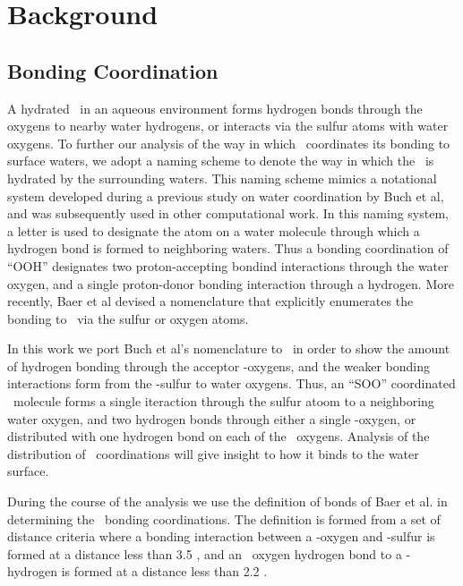 \section {Background}

\subsection {Bonding Coordination}

A hydrated \suldiox~in an aqueous environment forms hydrogen bonds through the oxygens to nearby water hydrogens, or interacts via the sulfur atoms with water oxygens. To further our analysis of the way in which \suldiox~coordinates its bonding to surface waters, we adopt a naming scheme to denote the way in which the \suldiox~is hydrated by the surrounding waters. This naming scheme mimics a notational system developed during a previous study on water coordination by Buch et al,\cite{Buch 2005} and was subsequently used in other computational work.\cite{Walker2006b} In this naming system, a letter is used to designate the atom on a water molecule through which a hydrogen bond is formed to neighboring waters. Thus a bonding coordination of ``OOH'' designates two proton-accepting bondind interactions through the water oxygen, and a single proton-donor bonding interaction through a hydrogen. More recently, Baer et al devised a nomenclature that explicitly enumerates the bonding to \suldiox~via the sulfur or oxygen atoms.\cite{Baer2010} 

In this work we port Buch et al's nomenclature to \suldiox~in order to show the amount of hydrogen bonding through the acceptor \suldiox-oxygens, and the weaker bonding interactions form from the \suldiox-sulfur to water oxygens. Thus, an ``SOO'' coordinated \suldiox~molecule forms a single iteraction through the sulfur atoom to a neighboring water oxygen, and two hydrogen bonds through either a single \suldiox-oxygen, or distributed with one hydrogen bond on each of the \suldiox~oxygens. Analysis of the distribution of \suldiox~coordinations will give insight to how it binds to the water surface.

During the course of the analysis we use the definition of bonds of Baer et al. in determining the \suldiox~bonding coordinations.\cite{Baer2010} The definition is formed from a set of distance criteria where a bonding interaction between a \wat-oxygen and \suldiox-sulfur is formed at a distance less than 3.5 \angs, and an \suldiox~oxygen hydrogen bond to a \wat-hydrogen is formed at a distance less than 2.2 \angs.

